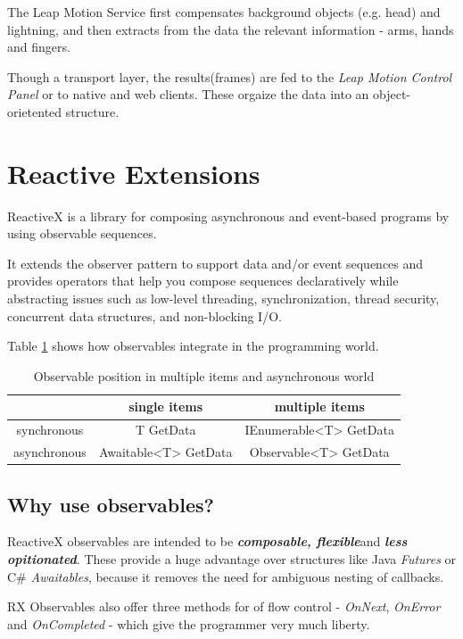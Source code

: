 \documentclass[12pt,a4paper,twoside]{report}
\begin{document}
The Leap Motion Service first compensates background objects (e.g. head) and lightning, and then extracts from the data the relevant information - arms, hands and fingers.

Though a transport layer, the results(frames) are fed to the \textit{Leap Motion Control Panel} or to native and web clients. These orgaize the data into an object-orietented structure.

\section{Reactive Extensions}

ReactiveX is a library for composing asynchronous and event-based programs by using observable sequences. \cite{RX_intro}

It extends the observer pattern to support data and/or event sequences and provides operators that help you compose sequences declaratively while abstracting issues such as low-level threading, synchronization, thread security, concurrent data structures, and non-blocking I/O.

Table \ref{table:rx} shows how observables integrate in the programming world.

\begin{table}[h]
  \centering
  \begin{tabular}{c | c | c}
    & single items & multiple items \\
    \hline
    synchronous & T GetData & IEnumerable<T> GetData \\
    asynchronous & Awaitable<T> GetData & Observable<T> GetData
  \end{tabular}
  \caption{Observable position in multiple items and asynchronous world}
  \label{table:rx}
\end{table}

\subsection{Why use observables?}
ReactiveX observables are intended to be \textbf{\textit{composable, flexible}}and \textbf{\textit{less opitionated}}. These provide a huge advantage over structures like Java \textit{Futures} or C\# \textit{Awaitables}, because it removes the need for ambiguous nesting of callbacks.

RX Observables also offer three methods for of flow control - \textit{OnNext}, \textit{OnError} and \textit{OnCompleted} - which give the programmer very much liberty.
\end{document}
